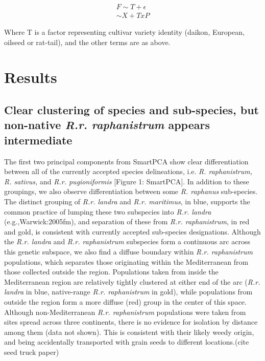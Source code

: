 \documentclass[twocolumn]{bmcart}%
\begin{document}
\begin{gather*}
	F \sim T + \epsilon  \label{3}\\ 
  \sim X + T x P
\end{gather*}

Where T is a factor representing cultivar variety identity (daikon, European, oilseed or rat-tail), and the other terms are as above.

\section*{Results} 

\subsection*{Clear clustering of species and sub-species, but non-native \textit{R.r. raphanistrum} appears intermediate}

The first two principal components from SmartPCA show clear differentiation between all of the currently accepted species delineations, i.e. \textit{R. raphanistrum, R. sativus,} and \textit{R.r. pugioniformis} [Figure 1: SmartPCA]. In addition to these groupings, we also observe differentiation between some \textit{R. raphanus} sub-species. The distinct grouping of \textit{R.r. landra} and \textit{R.r. maritimus}, in blue, supports the common practice of lumping these two subspecies into \textit{R.r. landra} (e.g.,{Warwick:2005fm}), and separation of these from \textit{R.r. raphanistrum}, in red and gold, is consistent with currently accepted sub-species designations. Although the \textit{R.r. landra} and \textit{R.r. raphanistrum} subspecies form a continuous arc across this genetic subspace, we also find a diffuse boundary within \textit{R.r. raphanistrum} populations, which separates those originating within the Mediterranean from those collected outside the region. Populations taken from inside the Mediterranean region are relatively tightly clustered at either end of the arc (\textit{R.r. landra} in blue, native-range \textit{R.r. raphanistrum} in gold), while populations from outside the region form a more diffuse (red) group in the center of this space. Although non-Mediterranean \textit{R.r. raphanistrum} populations were taken from sites spread across three continents, there is no evidence for isolation by distance among them (data not shown). This is consistent with their likely weedy origin, and being accidentally transported with grain seeds to different locations.(cite seed truck paper)
\end{document}
